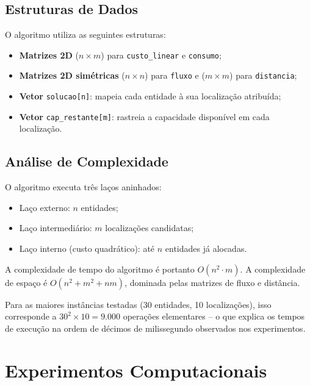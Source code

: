 \documentclass[12pt]{article}
\begin{document}
\subsection{Estruturas de Dados}

O algoritmo utiliza as seguintes estruturas:

\begin{itemize}
  \item \textbf{Matrizes 2D} ($n \times m$) para \texttt{custo\_linear} e
        \texttt{consumo};
  \item \textbf{Matrizes 2D simétricas} ($n \times n$) para \texttt{fluxo} e
        ($m \times m$) para \texttt{distancia};
  \item \textbf{Vetor} \texttt{solucao[n]}: mapeia cada entidade à sua
        localização atribuída;
  \item \textbf{Vetor} \texttt{cap\_restante[m]}: rastreia a capacidade
        disponível em cada localização.
\end{itemize}

\subsection{Análise de Complexidade}

O algoritmo executa três laços aninhados:

\begin{itemize}
  \item Laço externo: $n$ entidades;
  \item Laço intermediário: $m$ localizações candidatas;
  \item Laço interno (custo quadrático): até $n$ entidades já alocadas.
\end{itemize}

A complexidade de tempo do algoritmo é portanto $O(n^2 \cdot m)$.
A complexidade de espaço é $O(n^2 + m^2 + nm)$, dominada pelas matrizes
de fluxo e distância.

Para as maiores instâncias testadas (30 entidades, 10 localizações), isso
corresponde a $30^2 \times 10 = 9.000$ operações elementares -- o que explica
os tempos de execução na ordem de décimos de milissegundo observados nos
experimentos.


\section{Experimentos Computacionais}
\end{document}
